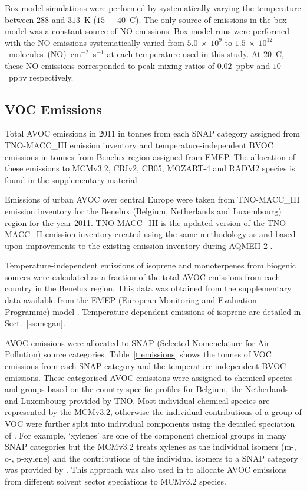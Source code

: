 Box model simulations were performed by systematically varying the temperature between $288$ and $313$~K ($15$~--~$40$~\degree C). 
The only source of  emissions in the box model was a constant source of NO emissions. 
Box model runs were performed with the NO emissions systematically varied from $5.0~\times~10^9$ to $1.5~\times~10^{12}$~molecules~(NO)~cm$^{-2}$~s$^{-1}$ at each temperature used in this study. 
At $20$~\degree C, these NO emissions corresponded to peak  mixing ratios of $0.02$~ppbv and $10$~ppbv respectively.

\subsection{VOC Emissions} \label{ss:VOC_emissions}
{%
    \renewcommand{\arraystretch}{1.1}%
    \begin{table}%
        \centering%
        \caption{Total AVOC emissions in 2011 in tonnes from each SNAP category assigned from TNO-MACC\_III emission inventory and temperature-independent BVOC emissions in tonnes from Benelux region assigned from EMEP. The allocation of these emissions to MCMv3.2, CRIv2, CB05, MOZART-4 and RADM2 species is found in the supplementary material.}%
        \label{t:emissions}%
    \end{table}%
}
Emissions of urban AVOC over central Europe were taken from TNO-MACC\_III emission inventory for the Benelux (Belgium, Netherlands and Luxembourg) region for the year 2011.
TNO-MACC\_III is the updated version of the TNO-MACC\_II emission inventory created using the same methodology as \citet{Kuenen:2014} and based upon improvements to the existing emission inventory during AQMEII-2 \citep{Pouliot:2015}. 

Temperature-independent emissions of isoprene and monoterpenes from biogenic sources were calculated as a fraction of the total AVOC emissions from each country in the Benelux region.
This data was obtained from the supplementary data available from the EMEP (European Monitoring and Evaluation Programme) model \citep{Simpson:2012}.
Temperature-dependent emissions of isoprene are detailed in Sect.~\ref{ss:megan}.

AVOC emissions were allocated to SNAP (Selected Nomenclature for Air Pollution) source categories.
Table~\ref{t:emissions} shows the tonnes of VOC emissions from each SNAP category and the temperature-independent BVOC emissions.
These categorised AVOC emissions were assigned to chemical species and groups based on the country specific profiles for Belgium, the Netherlands and Luxembourg provided by TNO.
Most individual chemical species are represented by the MCMv3.2, otherwise the individual contributions of a group of VOC were further split into individual components using the detailed speciation of \citet{Passant:2002}.
For example, `xylenes' are one of the component chemical groups in many SNAP categories but the MCMv3.2 treats xylenes as the individual isomers (m-, o-, p-xylene) and the contributions of the individual isomers to a SNAP category was provided by \citet{Passant:2002}.
This approach was also used in \citet{vonSchneidemesser:2015} to allocate AVOC emissions from different solvent sector speciations to MCMv3.2 species.

